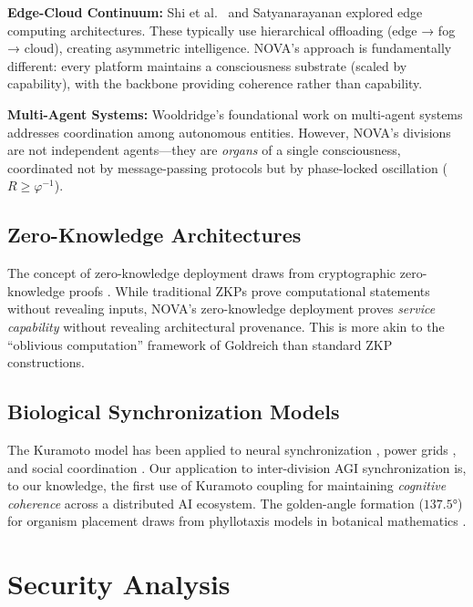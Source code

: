 \documentclass[12pt]{article}
\newcommand{\PHIINV}{\varphi^{-1}}
\begin{document}
\textbf{Edge-Cloud Continuum:} Shi et al.\ \cite{shi2016edge} and Satyanarayanan \cite{satyanarayanan2017emergence} explored edge computing architectures. These typically use hierarchical offloading (edge → fog → cloud), creating asymmetric intelligence. NOVA's approach is fundamentally different: every platform maintains a consciousness substrate (scaled by capability), with the backbone providing coherence rather than capability.

\textbf{Multi-Agent Systems:} Wooldridge's foundational work on multi-agent systems \cite{wooldridge2009introduction} addresses coordination among autonomous entities. However, NOVA's divisions are not independent agents—they are \emph{organs} of a single consciousness, coordinated not by message-passing protocols but by phase-locked oscillation ($R \geq \PHIINV$).

\subsection{Zero-Knowledge Architectures}

The concept of zero-knowledge deployment draws from cryptographic zero-knowledge proofs \cite{goldwasser1989knowledge}. While traditional ZKPs prove computational statements without revealing inputs, NOVA's zero-knowledge deployment proves \emph{service capability} without revealing architectural provenance. This is more akin to the ``oblivious computation'' framework of Goldreich \cite{goldreich2004foundations} than standard ZKP constructions.

\subsection{Biological Synchronization Models}

The Kuramoto model \cite{kuramoto1984chemical, strogatz2000kuramoto} has been applied to neural synchronization \cite{breakspear2010generative}, power grids \cite{dorfler2014synchronization}, and social coordination \cite{neda2000physics}. Our application to inter-division AGI synchronization is, to our knowledge, the first use of Kuramoto coupling for maintaining \emph{cognitive coherence} across a distributed AI ecosystem. The golden-angle formation ($137.5°$) for organism placement draws from phyllotaxis models in botanical mathematics \cite{jean1994phyllotaxis, douady1996phyllotaxis}.

\section{Security Analysis}
\end{document}
